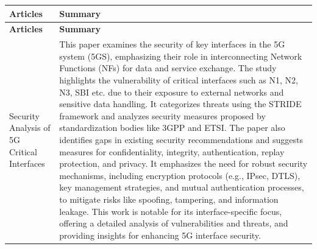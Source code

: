 \documentclass{report}
\begin{document}
\begin{longtable}{|p{4cm}|p{12cm}|}
    \hline
    \textbf{Articles} & \textbf{Summary} \\ 
    \hline
    \endfirsthead %
    \hline
    \textbf{Articles} & \textbf{Summary}  \\ 
    \hline
    \endhead %
    \hline
    \endfoot
    \hline
    \endlastfoot
    
    Security Analysis of 5G Critical Interfaces & This paper examines the security of key interfaces in the 5G system (5GS), emphasizing their role in interconnecting Network Functions (NFs) for data and service exchange. The study highlights the vulnerability of critical interfaces such as N1, N2, N3, SBI etc. due to their exposure to external networks and sensitive data handling. It categorizes threats using the STRIDE framework and analyzes security measures proposed by standardization bodies like 3GPP and ETSI.
    The paper also identifies gaps in existing security recommendations and suggests measures for confidentiality, integrity, authentication, replay protection, and privacy. It emphasizes the need for robust security mechanisms, including encryption protocols (e.g., IPsec, DTLS), key management strategies, and mutual authentication processes, to mitigate risks like spoofing, tampering, and information leakage.
    This work is notable for its interface-specific focus, offering a detailed analysis of vulnerabilities and threats, and providing insights for enhancing 5G interface security. \\
    \hline


\end{longtable}
\end{document}
